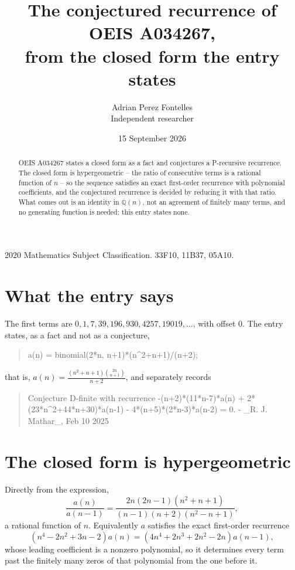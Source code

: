 \documentclass[11pt,a4paper]{article}
\title{The conjectured recurrence of OEIS A034267,\\ \large from the closed form the entry states}
\author{Adrian Perez Fontelles\\ \small Independent researcher}
\date{15 September 2026}
\theoremstyle{plain}
\theoremstyle{definition}
\begin{document}
\maketitle

\begin{abstract}
OEIS A034267 states a closed form as a fact and conjectures a P-recursive recurrence. The closed
form is hypergeometric -- the ratio of consecutive terms is a rational function of $n$ -- so the
sequence satisfies an exact first-order recurrence with polynomial coefficients, and the
conjectured recurrence is decided by reducing it with that ratio. What comes out is an identity
in $\mathbb{Q}(n)$, not an agreement of finitely many terms, and no generating function is
needed: this entry states none.
\end{abstract}

\noindent\small 2020 Mathematics Subject Classification. 33F10, 11B37, 05A10.\normalsize

\section{What the entry says}

The first terms are $0, 1, 7, 39, 196, 930, 4257, 19019,\dots$, with offset $0$. The entry states, as a fact and
not as a conjecture,

\begin{quote}\raggedright a(n) = binomial(2*n, n+1)*(n\^{}2+n+1)/(n+2);\end{quote}

\noindent that is, $a(n)=\frac{\left(n^{2} + n + 1\right) {\binom{2 n}{n + 1}}}{n + 2}$, and separately records

\begin{quote}\raggedright Conjecture D-finite with recurrence -(n+2)*(11*n-7)*a(n) + 2*(23*n\^{}2+44*n+30)*a(n-1) - 4*(n+5)*(2*n-3)*a(n-2) = 0. - \_R. J. Mathar\_, Feb 10 2025\end{quote}

\section{The closed form is hypergeometric}

Directly from the expression,
\[
  \frac{a(n)}{a(n-1)}=\frac{2 n \left(2 n - 1\right) \left(n^{2} + n + 1\right)}{\left(n - 1\right) \left(n + 2\right) \left(n^{2} - n + 1\right)} ,
\]
a rational function of $n$. Equivalently $a$ satisfies the exact first-order recurrence
\[
  \left(n^{4} - 2 n^{2} + 3 n - 2\right)a(n)
  =\left(4 n^{4} + 2 n^{3} + 2 n^{2} - 2 n\right)a(n-1) ,
\]
whose leading coefficient is a nonzero polynomial, so it determines every term past the finitely
many zeros of that polynomial from the one before it.
\end{document}
